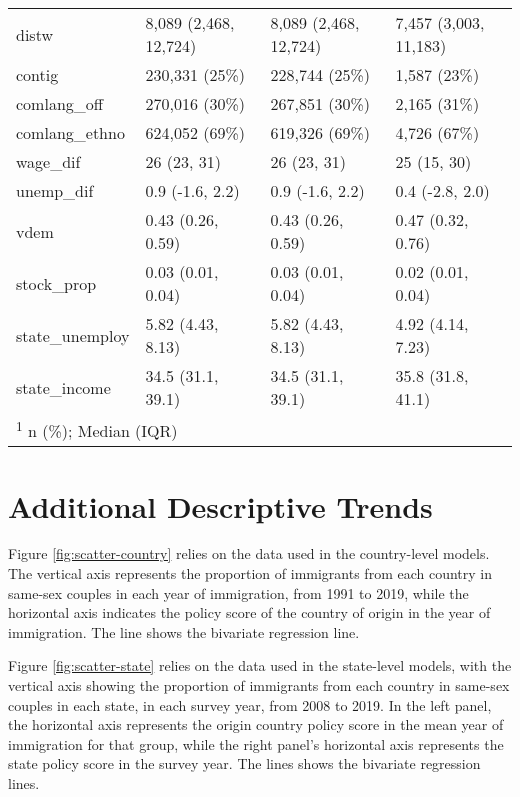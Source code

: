 \documentclass[
  11pt,
]{article}
\begin{document}
\begin{table}
\begin{tabular}[t]{llll}
distw & 8,089 (2,468, 12,724) & 8,089 (2,468, 12,724) & 7,457 (3,003, 11,183)\\
contig & 230,331 (25\%) & 228,744 (25\%) & 1,587 (23\%)\\
\addlinespace
comlang\_off & 270,016 (30\%) & 267,851 (30\%) & 2,165 (31\%)\\
comlang\_ethno & 624,052 (69\%) & 619,326 (69\%) & 4,726 (67\%)\\
wage\_dif & 26 (23, 31) & 26 (23, 31) & 25 (15, 30)\\
unemp\_dif & 0.9 (-1.6, 2.2) & 0.9 (-1.6, 2.2) & 0.4 (-2.8, 2.0)\\
vdem & 0.43 (0.26, 0.59) & 0.43 (0.26, 0.59) & 0.47 (0.32, 0.76)\\
\addlinespace
stock\_prop & 0.03 (0.01, 0.04) & 0.03 (0.01, 0.04) & 0.02 (0.01, 0.04)\\
state\_unemploy & 5.82 (4.43, 8.13) & 5.82 (4.43, 8.13) & 4.92 (4.14, 7.23)\\
state\_income & 34.5 (31.1, 39.1) & 34.5 (31.1, 39.1) & 35.8 (31.8, 41.1)\\
\bottomrule
\multicolumn{4}{l}{\rule{0pt}{1em}\textsuperscript{1} n (\%); Median (IQR)}\\
\end{tabular}
\end{table}

\newpage

\hypertarget{additional-descriptive-trends}{%
\section{Additional Descriptive Trends}\label{additional-descriptive-trends}}

Figure \ref{fig:scatter-country} relies on the data used in the country-level models. The vertical axis represents the proportion of immigrants from each country in same-sex couples in each year of immigration, from 1991 to 2019, while the horizontal axis indicates the policy score of the country of origin in the year of immigration. The line shows the bivariate regression line.

Figure \ref{fig:scatter-state} relies on the data used in the state-level models, with the vertical axis showing the proportion of immigrants from each country in same-sex couples in each state, in each survey year, from 2008 to 2019. In the left panel, the horizontal axis represents the origin country policy score in the mean year of immigration for that group, while the right panel's horizontal axis represents the state policy score in the survey year. The lines shows the bivariate regression lines.
\end{document}
